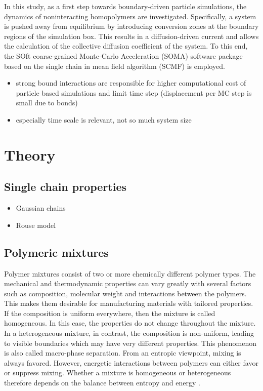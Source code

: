 \documentclass[bachelor,       %
               twoside,        %
               BCOR10mm,       %
                ngerman,english  %
               ]{GAUBM}
\begin{document}
In this study, as a first step towards boundary-driven particle simulations, the dynamics of noninteracting homopolymers are investigated. Specifically, a system is pushed away from equilibrium by introducing conversion zones at the boundary regions of the simulation box. This results in a diffusion-driven current and allows the calculation of the collective diffusion coefficient of the system. To this end, the SOft coarse-grained Monte-Carlo Acceleration (SOMA) \cite{Schneider_soma} software package based on the single chain in mean field algorithm (SCMF) \cite{Daoulas06} is employed.

\begin{itemize}
  \item strong bound interactions are responsible for higher computational cost of particle based simulations and limit time step (displacement per MC step is small due to bonds)
  \item especially time scale is relevant, not so much system size
\end{itemize}


\chapter{Theory}

\section{Single chain properties}

\begin{itemize}
  \item Gaussian chains
  \item Rouse model
\end{itemize}

\section{Polymeric mixtures}
Polymer mixtures consist of two or more chemically different polymer types. The mechanical and thermodynamic properties can vary greatly with several factors such as composition, molecular weight and interactions between the polymers. This makes them desirable for manufacturing materials with tailored properties.\\
If the composition is uniform everywhere, then the mixture is called homogeneous. In this case, the properties do not change throughout the mixture. In a heterogeneous mixture, in contrast, the composition is non-uniform, leading to visible boundaries which may have very different properties. This phenomenon is also called macro-phase separation. From an entropic viewpoint, mixing is always favored. However, energetic interactions between polymers can either favor or suppress mixing. Whether a mixture is homogeneous or heterogeneous therefore depends on the balance between entropy and energy \cite[S. 137]{Rubin03}.           
\end{document}

